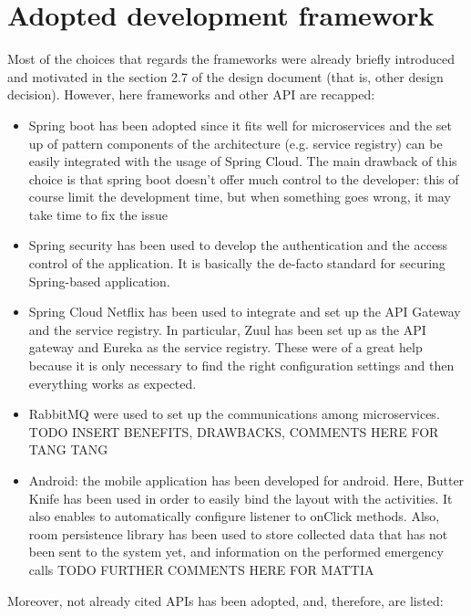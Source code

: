 \section{Adopted development framework}
Most of the choices that regards the frameworks were already briefly introduced and motivated in the
section 2.7 of the design document (that is, other design decision). 
However, here frameworks and other API are recapped:

\begin{itemize}

\item Spring boot has been adopted since it fits well for microservices and the set up of pattern components
of the architecture (e.g. service registry) can be easily integrated with the usage of Spring Cloud.
The main drawback of this choice is that spring boot doesn't offer much control to the developer: this of
course limit the development time, but when something goes wrong, it may take time to fix the issue

\item Spring security has been used to develop the authentication and the access control of the application.
It is basically the de-facto standard for securing Spring-based application. 

\item Spring Cloud Netflix has been used to integrate and set up the API Gateway and the service registry.
In particular, Zuul has been set up as the API gateway and Eureka as the service registry. 
These were of a great help because it is only necessary to find the right configuration settings and then everything works as expected.

\item RabbitMQ were used to set up the communications among microservices. 
TODO INSERT BENEFITS, DRAWBACKS, COMMENTS HERE FOR TANG TANG

\item Android: the mobile application has been developed for android. Here, Butter Knife has been used in order to easily bind the layout with the activities. It also enables to automatically configure listener to onClick methods. Also, room persistence library has been used to store
collected data that has not been sent to the system yet, and information on the performed emergency calls
TODO FURTHER COMMENTS HERE FOR MATTIA

\end{itemize}

Moreover, not already cited APIs has been adopted, and, therefore, are listed: 

